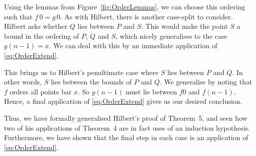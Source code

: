 \documentclass{article}
\begin{document}
Using the lemmas from Figure~\ref{fig:OrderLemmas}, we can choose this ordering such that $f\,0 = g\,0$. As with Hilbert, there is another case-split to consider. Hilbert asks whether $Q$ lies between $P$ and $S$. This would make the point $S$ a bound in the ordering of $P$, $Q$ and $S$, which nicely generalises to the case $g(n - 1) = x$. We can deal with this by an immediate application of \eqref{eq:OrderExtend}.

This brings us to Hilbert's penultimate case where $S$ lies between $P$ and $Q$. In other words, $S$ lies between the bounds of $P$ and $Q$. We generalise by noting that $f$ orders all points bar $x$. So $g(n - 1)$ must lie between $f 0$ and $f(n-1)$. Hence, a final application of \eqref{eq:OrderExtend} gives us our desired conclusion.

Thus, we have formally generalised Hilbert's proof of Theorem~5, and seen how two of his applications of Theorem~4 are in fact uses of an induction hypothesis. Furthermore, we have shown that the final step in each case is an application of \eqref{eq:OrderExtend}.




\appendix
\end{document}
